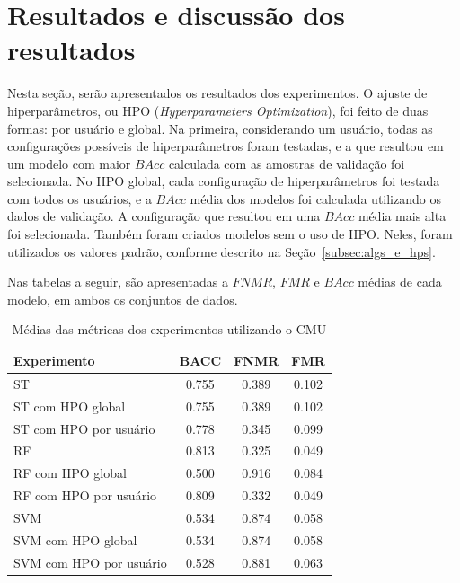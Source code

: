 \section{Resultados e discussão dos resultados}\label{sec:resultados}

Nesta seção, serão apresentados os resultados dos experimentos. O ajuste de hiperparâmetros, ou HPO (\textit{Hyperparameters Optimization}), foi feito de duas formas: por usuário e global. Na primeira, considerando um usuário, todas as configurações possíveis de hiperparâmetros foram testadas, e a que resultou em um modelo com maior $BAcc$ calculada com as amostras de validação foi selecionada. No HPO global, cada configuração de hiperparâmetros foi testada com todos os usuários, e a $BAcc$ média dos modelos foi calculada utilizando os dados de validação. A configuração que resultou em uma $BAcc$ média mais alta foi selecionada. Também foram criados modelos sem o uso de HPO. Neles, foram utilizados os valores padrão, conforme descrito na Seção~\ref{subsec:algs_e_hps}.

Nas tabelas a seguir, são apresentadas a $FNMR$, $FMR$ e $BAcc$ médias de cada modelo, em ambos os conjuntos de dados. 

\begin{table}[htbp]
\centering
\caption{Médias das métricas dos experimentos utilizando o CMU}\label{tab:exp_metric_averages_cmu}
\begin{tabular}{|l|c|c|c|}
\hline
\textbf{Experimento} & \textbf{BACC} & \textbf{FNMR} & \textbf{FMR} \\
\hline
ST & 0.755 & 0.389 & 0.102 \\
\hline
ST com HPO global & 0.755 & 0.389 & 0.102 \\
\hline
ST com HPO por usuário & 0.778 & 0.345 & 0.099 \\
\hline
RF & 0.813 & 0.325 & 0.049 \\
\hline
RF com HPO global & 0.500 & 0.916 & 0.084 \\
\hline
RF com HPO por usuário & 0.809 & 0.332 & 0.049 \\
\hline
SVM & 0.534 & 0.874 & 0.058 \\
\hline
SVM com HPO global & 0.534 & 0.874 & 0.058 \\
\hline
SVM com HPO por usuário & 0.528 & 0.881 & 0.063 \\
\hline
\end{tabular}
\end{table}

